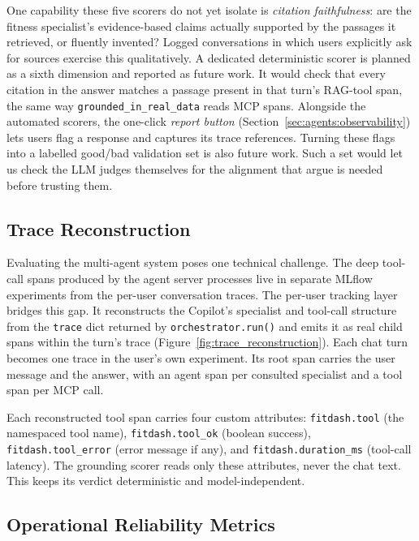 One capability these five scorers do not yet isolate is \textit{citation faithfulness}: are the fitness specialist's evidence-based claims actually supported by the passages it retrieved, or fluently invented? Logged conversations in which users explicitly ask for sources exercise this qualitatively. A dedicated deterministic scorer is planned as a sixth dimension and reported as future work. It would check that every citation in the answer matches a passage present in that turn's RAG-tool span, the same way \texttt{grounded\_in\_real\_data} reads MCP spans. Alongside the automated scorers, the one-click \textit{report button} (Section~\ref{sec:agents:observability}) lets users flag a response and captures its trace references. Turning these flags into a labelled good/bad validation set is also future work. Such a set would let us check the LLM judges themselves for the alignment that \cite{shankar_validates_2024} argue is needed before trusting them.

\subsection{Trace Reconstruction}\label{sec:evaluation:trace}

Evaluating the multi-agent system poses one technical challenge. The deep tool-call spans produced by the agent server processes live in separate MLflow experiments from the per-user conversation traces. The per-user tracking layer bridges this gap. It reconstructs the Copilot's specialist and tool-call structure from the \texttt{trace} dict returned by \texttt{orchestrator.run()} and emits it as real child spans within the turn's trace (Figure~\ref{fig:trace_reconstruction}). Each chat turn becomes one trace in the user's own experiment. Its root span carries the user message and the answer, with an agent span per consulted specialist and a tool span per MCP call.



Each reconstructed tool span carries four custom attributes: \texttt{fitdash.tool} (the namespaced tool name), \texttt{fitdash.tool\_ok} (boolean success), \texttt{fitdash.tool\_error} (error message if any), and \texttt{fitdash.duration\_ms} (tool-call latency). The grounding scorer reads only these attributes, never the chat text. This keeps its verdict deterministic and model-independent.

\subsection{Operational Reliability Metrics}\label{sec:evaluation:reliability}

